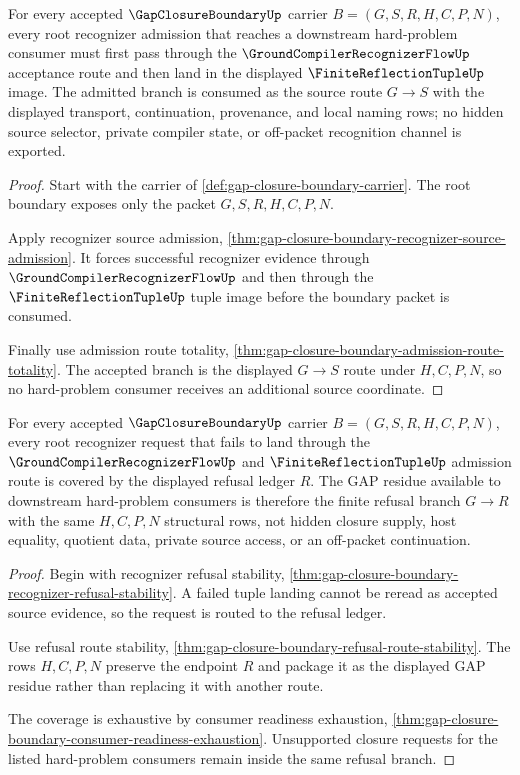 \begin{theorem}
\label{thm:gap-closure-boundary-root-recognizer-admission-totality}
For every accepted $\GapClosureBoundaryUp$ carrier $B=(G,S,R,H,C,P,N)$, every root recognizer admission that reaches a downstream hard-problem consumer must first pass through the $\GroundCompilerRecognizerFlowUp$ acceptance route and then land in the displayed $\FiniteReflectionTupleUp$ image. The admitted branch is consumed as the source route $G \longrightarrow S$ with the displayed transport, continuation, provenance, and local naming rows; no hidden source selector, private compiler state, or off-packet recognition channel is exported.
\end{theorem}
\begin{proof}
Start with the carrier of \autoref{def:gap-closure-boundary-carrier}. The root boundary exposes only the packet $G,S,R,H,C,P,N$.

Apply recognizer source admission, \autoref{thm:gap-closure-boundary-recognizer-source-admission}. It forces successful recognizer evidence through $\GroundCompilerRecognizerFlowUp$ and then through the $\FiniteReflectionTupleUp$ tuple image before the boundary packet is consumed.

Finally use admission route totality, \autoref{thm:gap-closure-boundary-admission-route-totality}. The accepted branch is the displayed $G \longrightarrow S$ route under $H,C,P,N$, so no hard-problem consumer receives an additional source coordinate.
\end{proof}

\begin{theorem}
\label{thm:gap-closure-boundary-root-refusal-ledger-coverage}
For every accepted $\GapClosureBoundaryUp$ carrier $B=(G,S,R,H,C,P,N)$, every root recognizer request that fails to land through the $\GroundCompilerRecognizerFlowUp$ and $\FiniteReflectionTupleUp$ admission route is covered by the displayed refusal ledger $R$. The GAP residue available to downstream hard-problem consumers is therefore the finite refusal branch $G \longrightarrow R$ with the same $H,C,P,N$ structural rows, not hidden closure supply, host equality, quotient data, private source access, or an off-packet continuation.
\end{theorem}
\begin{proof}
Begin with recognizer refusal stability, \autoref{thm:gap-closure-boundary-recognizer-refusal-stability}. A failed tuple landing cannot be reread as accepted source evidence, so the request is routed to the refusal ledger.

Use refusal route stability, \autoref{thm:gap-closure-boundary-refusal-route-stability}. The rows $H,C,P,N$ preserve the endpoint $R$ and package it as the displayed GAP residue rather than replacing it with another route.

The coverage is exhaustive by consumer readiness exhaustion, \autoref{thm:gap-closure-boundary-consumer-readiness-exhaustion}. Unsupported closure requests for the listed hard-problem consumers remain inside the same refusal branch.
\end{proof}

